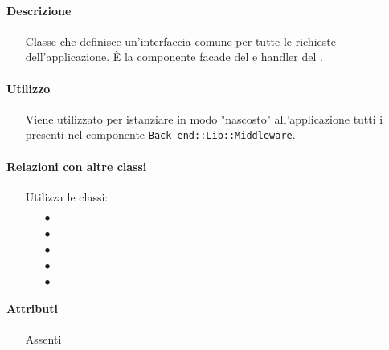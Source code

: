 \paragraph*{Descrizione}
\begin{itemize}
\item[] Classe che definisce un'interfaccia comune per tutte le richieste dell'applicazione. È la componente facade del   e handler del  .
\end{itemize}

\paragraph*{Utilizzo}
\begin{itemize}
\item[] Viene utilizzato per istanziare in modo "nascosto" all'applicazione tutti i  presenti nel componente \texttt{Back-end::Lib::Middleware}.
\end{itemize}

\paragraph*{Relazioni con altre classi}
\begin{itemize}


\item[] Utilizza le classi:
\begin{itemize}
\item[$\bullet$] 
\item[$\bullet$] 
\item[$\bullet$] 
\item[$\bullet$] 
\item[$\bullet$] 
\end{itemize}
\end{itemize}

\paragraph*{Attributi}
\begin{itemize}
\item[] Assenti
\end{itemize}

